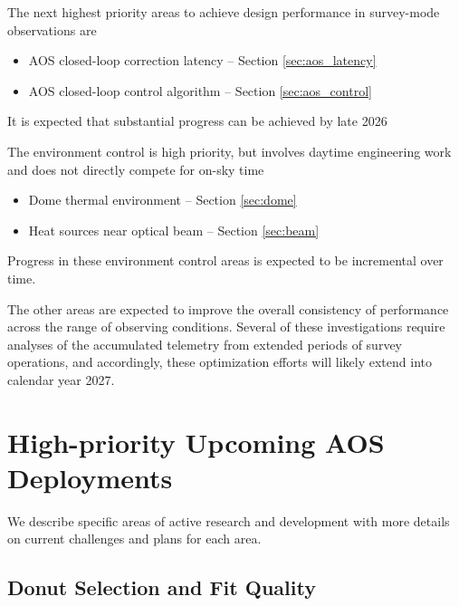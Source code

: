 \documentclass[SO,lsst,authoryear,toc]{lsstdoc}
\begin{document}
The next highest priority areas to achieve design performance in survey-mode observations are
\begin{itemize}
  \item AOS closed-loop correction latency -- Section \ref{sec:aos_latency}
  \item AOS closed-loop control algorithm -- Section \ref{sec:aos_control}
\end{itemize}
It is expected that substantial progress can be achieved by late 2026

The environment control is high priority, but involves daytime engineering work and does not directly compete for on-sky time
\begin{itemize}
  \item Dome thermal environment -- Section \ref{sec:dome}
  \item Heat sources near optical beam -- Section \ref{sec:beam}
\end{itemize}
Progress in these environment control areas is expected to be incremental over time.

The other areas are expected to improve the overall consistency of performance across the range of observing conditions.
Several of these investigations require analyses of the accumulated telemetry from extended periods of survey operations, and accordingly, these optimization efforts will likely extend into calendar year 2027.


\section{High-priority Upcoming AOS Deployments}
\label{sec:aos_deployments}

We describe specific areas of active research and development with more details on current challenges and plans for each area.

\subsection{Donut Selection and Fit Quality}
\label{sec:donut}
\end{document}
